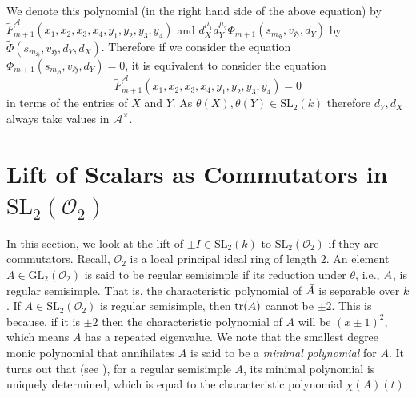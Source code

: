 \documentclass[10pt,twoside]{amsart}
\newcommand{\GL}{\mathrm{GL}}
\newcommand{\SL}{\mathrm{SL}}
\newcommand{\tr}{\mathrm{tr}}
\newcommand{\R}{\mathcal{O}_2}
\theoremstyle{definition}
\theoremstyle{definition}
\begin{document}
We denote this polynomial (in the right hand side of the above equation) by $\widetilde F_{m+1}^{\mathcal{A}}(x_1,x_2,x_3,x_4,y_1,y_2,y_3,y_4)$ and $d_X^{\mu_1} d_Y^{\mu_2}\Phi_{m+1}(s_{m_{\mathfrak{H}}},v_{\mathfrak{H}}, d_{Y})$ by $\widetilde \Phi(s_{m_{\mathfrak{H}}},v_{\mathfrak{H}}, d_{Y},d_X)$. Therefore if we consider the equation $\Phi_{m+1}(s_{m_{\mathfrak{H}}},v_{\mathfrak{H}}, d_{Y})=0$, it is equivalent to consider the equation $$\widetilde F_{m+1}^{\mathcal{A}}(x_1,x_2,x_3,x_4,y_1,y_2,y_3,y_4)=0$$ in terms of the entries of $X$ and $Y$. As $\theta (X),\theta(Y)\in \SL_2(k)$ therefore $d_Y,d_X$  always take values in $\mathcal{A}^{\times}$. 





 


\section{Lift of Scalars as Commutators in $\SL_2(\R)$}{\label{commutator-local ring-length two}}

In this section, we look at the lift of $\pm I \in \SL_2(k)$ to $\SL_2(\R)$ if they are commutators. Recall, $\R$ is a local principal ideal ring of length $2$. An element $A \in \GL_2(\R)$ is said to be regular semisimple if its reduction under $\theta$, i.e., $\Bar{A}$, is regular semisimple. That is, the characteristic polynomial of $\Bar{A}$ is separable over $k$. If $A \in \SL_2(\R)$ is regular semisimple, then $\tr(\Bar{A})$ cannot be $\pm 2$. This is because, if it is $\pm 2$ then the characteristic polynomial of $\bar A$ will be $(x \pm 1)^2$, which means $\bar A$ has a repeated eigenvalue. We note that the smallest degree monic polynomial that annihilates $A$ is said to be a \emph{minimal polynomial} for $A$. It turns out that (see \cite[section 3]{PanjaRoySingh2025}), for a regular semisimple $A$, its minimal polynomial is uniquely determined, which is equal to the characteristic polynomial $\chi(A)(t)$.
\end{document}
